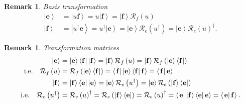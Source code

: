 \documentclass[aps,preprint]{revtex4}%
\newtheorem{remark}[theorem]{Remark}
\begin{document}
\begin{remark}
Basis transformation
\begin{align}
\left\vert \mathbf{e}\right\rangle  &  =\left\vert u\mathbf{f}\right\rangle
=u\left\vert \mathbf{f}\right\rangle =\left\vert \mathbf{f}\right\rangle
\mathcal{R}_{f}\left(  u\right) \\
\left\vert \mathbf{f}\right\rangle  &  =\left\vert u^{\dagger}\mathbf{e}%
\right\rangle =u^{\dagger}\left\vert \mathbf{e}\right\rangle =\left\vert
\mathbf{e}\right\rangle \mathcal{R}_{e}\left(  u^{\dagger}\right)  =\left\vert
\mathbf{e}\right\rangle \mathcal{R}_{e}\left(  u\right)  ^{\dagger}.
\end{align}

\end{remark}

\begin{remark}
Transformation matrices%
\begin{align}
\left\vert \mathbf{e}\right\rangle  &  =\left\vert \mathbf{e}\right\rangle
\left\langle \mathbf{f}\right\vert \left\vert \mathbf{f}\right\rangle
=\left\vert \mathbf{f}\right\rangle \mathcal{R}_{f}\left(  u\right)
=\left\vert \mathbf{f}\right\rangle \mathcal{R}_{f}\left(  \left\vert
\mathbf{e}\right\rangle \left\langle \mathbf{f}\right\vert \right)  \quad\\
\text{i.e.\quad}\mathcal{R}_{f}\left(  u\right)   &  =\mathcal{R}_{f}\left(
\left\vert \mathbf{e}\right\rangle \left\langle \mathbf{f}\right\vert \right)
=\left\langle \left.  \mathbf{f}\right\vert \left\vert \mathbf{e}\right\rangle
\left\langle \mathbf{f}\right\vert \mathbf{f}\right\rangle =\left\langle
\left.  \mathbf{f}\right\vert \mathbf{e}\right\rangle \\
\left\vert \mathbf{f}\right\rangle  &  =\left\vert \mathbf{f}\right\rangle
\left\langle \mathbf{e}\right\vert \left\vert \mathbf{e}\right\rangle
=\left\vert \mathbf{e}\right\rangle \mathcal{R}_{e}\left(  u^{\dagger}\right)
=\left\vert \mathbf{e}\right\rangle \mathcal{R}_{e}\left(  \left\vert
\mathbf{f}\right\rangle \left\langle \mathbf{e}\right\vert \right)  \quad\\
\text{i.e.\quad}\mathcal{R}_{e}\left(  u^{\dagger}\right)   &  =\mathcal{R}%
_{e}\left(  u\right)  ^{\dagger}=\mathcal{R}_{e}\left(  \left\vert
\mathbf{f}\right\rangle \left\langle \mathbf{e}\right\vert \right)
=\mathcal{R}_{e}\left(  u\right)  ^{\dagger}=\left\langle \left.
\mathbf{e}\right\vert \left\vert \mathbf{f}\right\rangle \left\langle
\mathbf{e}\right\vert \mathbf{e}\right\rangle =\left\langle \left.
\mathbf{e}\right\vert \mathbf{f}\right\rangle .
\end{align}

\end{remark}
\end{document}
